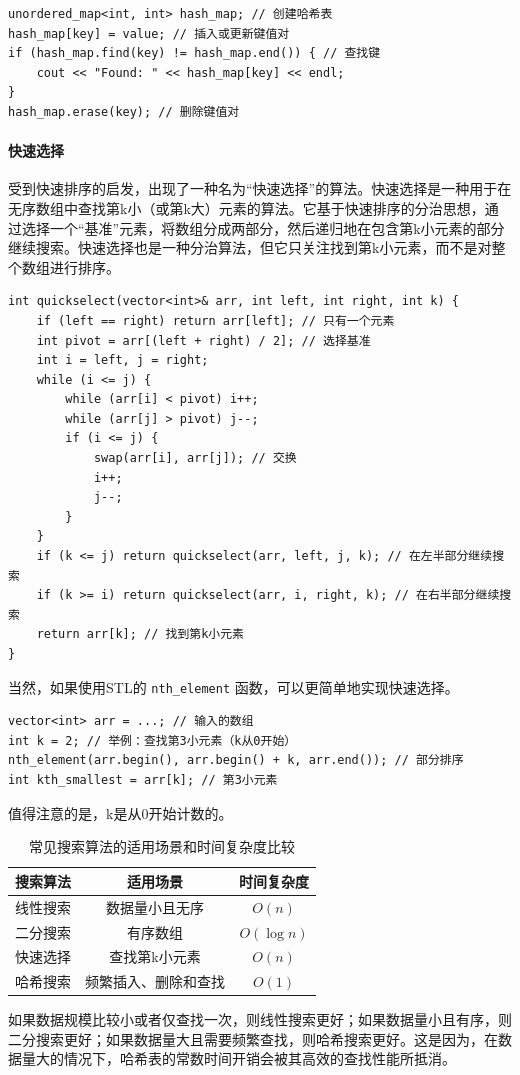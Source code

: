 \begin{verbatim}
unordered_map<int, int> hash_map; // 创建哈希表
hash_map[key] = value; // 插入或更新键值对
if (hash_map.find(key) != hash_map.end()) { // 查找键
    cout << "Found: " << hash_map[key] << endl;
}
hash_map.erase(key); // 删除键值对
\end{verbatim}

\paragraph{快速选择} 受到快速排序的启发，出现了一种名为“快速选择”的算法。快速选择是一种用于在无序数组中查找第k小（或第k大）元素的算法。它基于快速排序的分治思想，通过选择一个“基准”元素，将数组分成两部分，然后递归地在包含第k小元素的部分继续搜索。快速选择也是一种分治算法，但它只关注找到第k小元素，而不是对整个数组进行排序。

\begin{verbatim}
int quickselect(vector<int>& arr, int left, int right, int k) {
    if (left == right) return arr[left]; // 只有一个元素
    int pivot = arr[(left + right) / 2]; // 选择基准
    int i = left, j = right;
    while (i <= j) {
        while (arr[i] < pivot) i++;
        while (arr[j] > pivot) j--;
        if (i <= j) {
            swap(arr[i], arr[j]); // 交换
            i++;
            j--;
        }
    }
    if (k <= j) return quickselect(arr, left, j, k); // 在左半部分继续搜索
    if (k >= i) return quickselect(arr, i, right, k); // 在右半部分继续搜索
    return arr[k]; // 找到第k小元素
}
\end{verbatim}

当然，如果使用STL的 \texttt{nth\_element} 函数，可以更简单地实现快速选择。
\begin{verbatim}
vector<int> arr = ...; // 输入的数组
int k = 2; // 举例：查找第3小元素（k从0开始）
nth_element(arr.begin(), arr.begin() + k, arr.end()); // 部分排序
int kth_smallest = arr[k]; // 第3小元素
\end{verbatim}
值得注意的是，k是从0开始计数的。

\begin{table}[ht]
    \centering
    \begin{tabular}{c|c|c}
        \hline
        搜索算法 & 适用场景 & 时间复杂度 \\
        \hline
        线性搜索 & 数据量小且无序 & $O(n)$ \\
        二分搜索 & 有序数组 & $O(\log n)$ \\
        快速选择 & 查找第k小元素 & $O(n)$ \\
        哈希搜索 & 频繁插入、删除和查找 & $O(1)$ \\
        \hline
    \end{tabular}
    \caption{常见搜索算法的适用场景和时间复杂度比较}
\end{table}
如果数据规模比较小或者仅查找一次，则线性搜索更好；如果数据量小且有序，则二分搜索更好；如果数据量大且需要频繁查找，则哈希搜索更好。这是因为，在数据量大的情况下，哈希表的常数时间开销会被其高效的查找性能所抵消。

